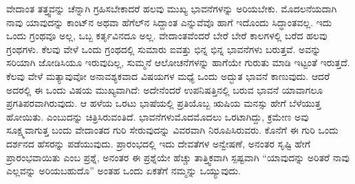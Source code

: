 ವೇದಾಂತ ತತ್ತ್ವವನ್ನು ಚೆನ್ನಾಗಿ ಗ್ರಹಿಸಬೇಕಾದರೆ ಹಲವು ಮುಖ್ಯ ಭಾವನೆಗಳನ್ನು ಅರಿಯಬೇಕು. ಮೊದಲನೆಯದಾಗಿ ನಾವು ಯಾವುದನ್ನು ಕಾಂಟ್‌ನ ಅಥವಾ ಹೆಗೆಲ್‌ನ ಸಿದ್ದಾಂತ ಎನ್ನುವೆವೊ ಹಾಗೆ ಇದೊಂದು ಸಿದ್ಧಾಂತವಲ್ಲ. ಇದು ಒಂದು ಗ್ರಂಥವೂ ಅಲ್ಲ, ಒಬ್ಬ ಕರ್ತೃವಿನದೂ ಅಲ್ಲ. ವೇದಾಂತವೆಂದರೆ ಬೇರೆ ಬೇರೆ ಕಾಲಗಳಲ್ಲಿ ಬರೆದ ಹಲವು ಗ್ರಂಥಗಳು. ಕೆಲವು ವೇಳೆ ಒಂದು ಗ್ರಂಥದಲ್ಲಿ ಸುಮಾರು ಐವತ್ತು ಭಿನ್ನ ಭಿನ್ನ ಭಾವನೆಗಳು ಬರುತ್ತವೆ. ಅವನ್ನು ಸರಿಯಾಗಿ ಜೋಡಿಸಿಯೂ ಇರುವುದಿಲ್ಲ, ಸುಮ್ಮನೆ ಆಲೋಚನೆಗಳನ್ನು ಹಾಗೆಯೇ ಗುರುತು ಮಾಡಿ ಇಟ್ಟಂತೆ ಇರುತ್ತದೆ. ಕೆಲವು ವೇಳೆ ಮತ್ಯಾವುವೋ ಅನಾವಶ್ಯಕವಾದ ವಿಷಯಗಳ ಮಧ್ಯೆ ಒಂದು ಅದ್ಭುತ ಭಾವನೆ ಕಾಣುವುದು. ಆದರೆ ಅದರಲ್ಲಿ ಈ ಒಂದು ವಿಷಯ ಮುಖ್ಯವಾಗಿದೆ: ಅದೇನೆಂದರೆ ಉಪನಿಷತ್ತಿನಲ್ಲಿ ಬರುವ ಭಾವನೆ ಯಾವಾಗಲೂ ಪ್ರಗತಿಪರವಾಗಿರುವುದು. ಆ ಹಳೆಯ ಒರಟು ಭಾಷೆಯಲ್ಲಿ ಪ್ರತಿಯೊಬ್ಬ ಋಷಿಯ ಮನಸ್ಸು ಹೇಗೆ ಬೆಳೆಯುತ್ತ ಹೋಯಿತು. ಎಂಬುದನ್ನು ಚಿತ್ರಿಸಿರುವಂತಿದೆ. ಭಾವನೆಗಳು\break ಮೊದಮೊದಲು ಒರಟಾಗಿದ್ದು, ಕ್ರಮೇಣ ಅವು ಸೂಕ್ಷ್ಮವಾಗುತ್ತ ಬಂದು ವೇದಾಂತದ ಗುರಿ ಸೇರುವುದನ್ನು ವಿವರವಾಗಿ ನಿರೂಪಿಸಿರುವರು. ಕೊನೆಗೆ ಈ ಗುರಿ ಒಂದು ದರ್ಶನದ ಹೆಸರನ್ನು ಪಡೆಯುವುದು. ಪ್ರಾರಂಭದಲ್ಲಿ ಇದು ದೇವತೆಗಳ ಅನ್ವೇಷಣೆ, ಅನಂತರ ಸೃಷ್ಟಿ ಹೇಗೆ ಪ್ರಾರಂಭವಾಯಿತು ಎಂಬ ಪ್ರಶ್ನೆ, ಅನಂತರ ಈ ಪ್ರಶ್ನೆಯೇ ಹೆಚ್ಚು ತಾತ್ತ್ವಿಕವಾಗಿ ಸ್ಪಷ್ಟವಾಗಿ “ಯಾವುದನ್ನು ಅರಿತರೆ ನಾವು ಎಲ್ಲವನ್ನು ಅರಿಯಬಹುದೊ” ಅಂತಹ ಒಂದು ಏಕತೆಗೆ ನಮ್ಮನ್ನು ಒಯ್ಯುವುದು.

